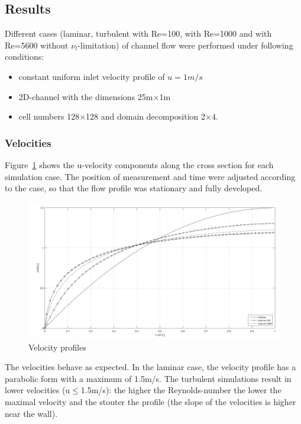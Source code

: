\documentclass[11pt,a4paper]{article}
\begin{document}
\clearpage


\subsection{Results}
Different cases (laminar, turbulent with Re=100, with Re=1000 and with Re=5600 without $\nu_t$-limitation) of channel flow were performed under following conditions:
\begin{itemize}
\item constant uniform inlet velocity profile of $u=1m/s$
\item 2D-channel with the dimensions 25m$\times$1m
\item cell numbers 128$\times$128 and domain decomposition 2$\times$4.
\end{itemize}

\subsubsection{Velocities}
\noindent Figure~\ref{fig:vels} shows the u-velocity components along the cross section for each simulation case. The position of measurement and time were adjusted according to the case, so that the flow profile was stationary and fully developed.

\begin{figure}[h]
    \centering
    \includegraphics[width=1.0\textwidth]{velocities}
    \caption{Velocity profiles}
    \label{fig:vels}
\end{figure}

\noindent The velocities behave as expected. In the laminar case, the velocity profile has a parabolic form with a maximum of 1.5m/s. The turbulent simulations result in lower velocities (u$\le$1.5m/s): the higher the Reynolds-number the lower  the maximal velocity and the stouter the profile (the slope of the velocities is higher near the wall).
\end{document}
